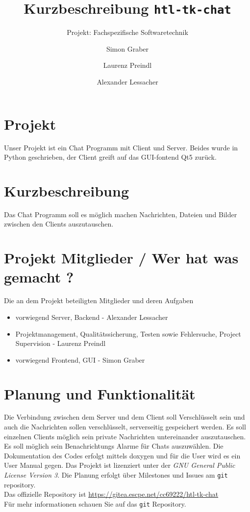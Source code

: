 \documentclass[a4paper,ngerman,headsepline]{scrreprt}
\begin{document}
\title{Kurzbeschreibung \texttt{htl-tk-chat}}
\subtitle{Projekt: Fachspezifische Softwaretechnik}
\author{Simon Graber \and Laurenz Preindl \and Alexander Lessacher}

\maketitle
\section*{Projekt}
Unser Projekt ist ein Chat Programm mit Client und Server. Beides wurde in Python geschrieben, der Client greift auf das GUI-fontend Qt5 zurück.%

\section*{Kurzbeschreibung}
Das Chat Programm soll es möglich machen Nachrichten, Dateien und Bilder zwischen den Clients auszutauschen.

\section*{Projekt Mitglieder / Wer hat was gemacht ?}
Die an dem Projekt beteiligten Mitglieder und deren Aufgaben
\begin{itemize}
 \item vorwiegend Server, Backend - Alexander Lessacher
 \item Projektmanagement, Qualitätssicherung, Testen sowie Fehlersuche, Project Supervision - Laurenz Preindl
 \item vorwiegend Frontend, GUI - Simon Graber
\end{itemize}

\section*{Planung und Funktionalität}
Die Verbindung zwischen dem Server und dem Client soll Verschlüsselt sein und auch die Nachrichten sollen verschlüsselt, serverseitig gespeichert werden. Es soll einzelnen Clients möglich sein private Nachrichten untereinander auszutauschen. Es soll möglich sein Benachrichtungs Alarme für Chats auszuwählen. Die Dokumentation des Codes erfolgt mittels doxygen und für die User wird es ein User Manual gegen.
Das Projekt ist lizenziert unter der \textit{GNU General Public License Version 3}.
Die Planung erfolgt über Milestones und Issues am \texttt{git} repository.\\
Das offizielle Repository ist \url{https://gitea.escpe.net/cc69222/htl-tk-chat}\\
Für mehr informationen schauen Sie auf das \texttt{git} Repository.
\end{document}
